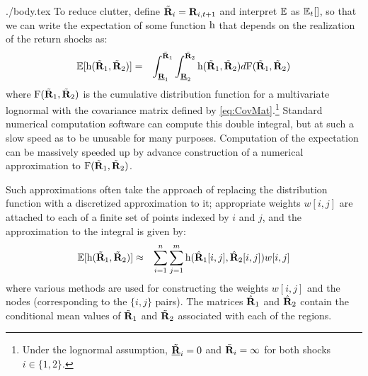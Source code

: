 \documentclass{handout}
\begin{document}
\begin{verbatimwrite}{./body.tex}
To reduce clutter, define $\tilde{\mathbf{R}}_{i}=\mathbf{R}_{i,t+1}$ and interpret $\operatorname{\mathbb{E}}$ as $\operatorname{\mathbb{E}}_{t}[]$, so that we can write the expectation of some function $\mathrm{h}$ that depends on the realization of
the return shocks as:
\begin{equation}\begin{gathered}\begin{aligned}
  \operatorname{\mathbb{E}}[\mathrm{h}(\tilde{\mathbf{R}}_{1},\tilde{\mathbf{R}}_{2})] & = & \int_{\underline{{\mathbf{R}}}_{1}}^{\bar{\mathbf{R}}_{1}}\int_{\underline{\mathbf{R}}_{2}}^{\bar{\mathbf{R}}_{2}} \mathrm{h}(\tilde{\mathbf{R}}_{1},\tilde{\mathbf{R}}_{2}) d\mathrm{F}(\tilde{\mathbf{R}}_{1},\tilde{\mathbf{R}}_{2})
\end{aligned}\end{gathered}\end{equation}
where $\mathrm{F}(\tilde{\mathbf{R}}_{1},\tilde{\mathbf{R}}_{2})$ is the cumulative distribution
function for a multivariate lognormal with the covariance matrix defined by \eqref{eq:CovMat}.\footnote{Under the lognormal assumption, $\underline{\tilde{\mathbf{R}}}_{i}=0$ and $\bar{\mathbf{R}}_{i}=\infty$ for both shocks $i \in \{1,2\}$.}  Standard numerical computation software can compute this
double integral, but at such a slow speed as to be unusable for many purposes.
Computation of the expectation can be massively speeded up by
advance construction of a numerical approximation to
$\mathrm{F}(\tilde{\mathbf{R}}_{1},\tilde{\mathbf{R}}_{2})$.

Such approximations often take the approach of replacing the distribution function
with a discretized approximation to it; appropriate weights $w[i,j]$ are attached to
each of a finite set of points indexed by $i$ and $j$, and 
the approximation to the integral is given by:
\begin{equation}\begin{gathered}\begin{aligned}
  \operatorname{\mathbb{E}}[\mathrm{h}(\tilde{\mathbf{R}}_{1},\tilde{\mathbf{R}}_{2})] & \approx & \sum_{i=1}^{n}\sum_{j=1}^{m} \mathrm{h}(\hat{\mathbf{R}}_{1}[i,j],\hat{\mathbf{R}}_{2}[i,j])w[i,j]  \label{eq:wtdAvg}
\end{aligned}\end{gathered}\end{equation}
where various methods are used for constructing the weights $w[i,j]$ and the nodes (corresponding to the $\{i,j\}$ pairs).  The matrices $\hat{\mathbf{R}}_{1}$ and $\hat{\mathbf{R}}_{2}$ contain the conditional mean values of $\tilde{\mathbf{R}}_{1}$ and $\tilde{\mathbf{R}}_{2}$ associated with each of the regions.


\end{verbatimwrite}
\end{document}
